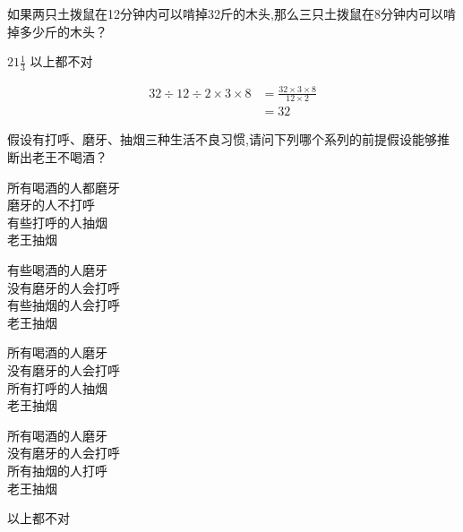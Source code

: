 \documentclass[answers]{exam}
\begin{document}
\begin{questions}
	\question  如果两只土拨鼠在12分钟内可以啃掉32斤的木头,那么三只土拨鼠在8分钟内可以啃掉多少斤的木头？
	\begin{oneparchoices}
		\choice \( 21\frac13 \)    \choice 以上都不对
	\end{oneparchoices}

	\begin{solution}
		\begin{align*}
			32 \div 12 \div 2 \times 3 \times 8 & = \frac{32 \times 3 \times 8}{12 \times 2} \\
			                                    & = 32
		\end{align*}
	\end{solution}

	\question 假设有打呼、磨牙、抽烟三种生活不良习惯,请问下列哪个系列的前提假设能够推断出老王不喝酒？

	\begin{oneparchoices}
		\choice
		\begin{minipage}{0.25\textwidth}
			所有喝酒的人都磨牙\\
			磨牙的人不打呼 \\
			有些打呼的人抽烟 \\
			老王抽烟
		\end{minipage}
		\choice
		\begin{minipage}{0.25\textwidth}
			有些喝酒的人磨牙 \\
			没有磨牙的人会打呼 \\
			有些抽烟的人会打呼 \\
			老王抽烟
		\end{minipage}
		\choice
		\begin{minipage}{0.25\textwidth}
			所有喝酒的人磨牙 \\
			没有磨牙的人会打呼 \\
			所有打呼的人抽烟 \\
			老王抽烟
		\end{minipage}
		\CorrectChoice
		\begin{minipage}{0.25\textwidth}
			所有喝酒的人磨牙 \\
			没有磨牙的人会打呼 \\
			所有抽烟的人打呼 \\
			老王抽烟
		\end{minipage}
		\choice
		\begin{minipage}{0.25\textwidth}
			以上都不对
		\end{minipage}
	\end{oneparchoices}


\end{questions}
\end{document}
